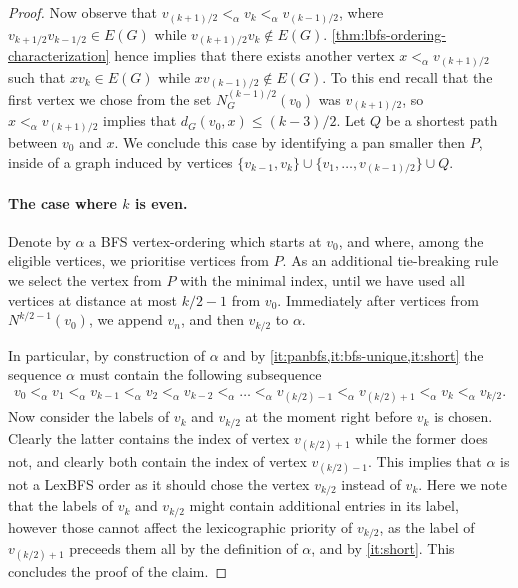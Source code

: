 \documentclass{svproc}
\begin{document}
\begin{proof}
Now observe that $v_{(k+1)/2}<_{\alpha}v_k<_{\alpha}v_{(k-1)/2}$, where
$v_{k+1/2}v_{k-1/2}\in E(G)$ while
$v_{(k+1)/2}v_k\notin E(G)$.  
\cref{thm:lbfs-ordering-characterization} hence implies that there exists another vertex $x<_{\alpha}v_{(k+1)/2}$ such that $xv_k\in E(G)$
while $xv_{(k-1)/2}\notin E(G)$.
To this end recall that the first vertex we chose 
from the set $N_G^{(k-1)/2}(v_0)$ was $v_{(k+1)/2}$, so $x<_{\alpha}v_{(k+1)/2}$ implies that 
$d_G(v_0,x)\le (k-3)/2$. 
Let $Q$ be a shortest path between $v_0$ and $x$.
We conclude this case by identifying a pan smaller then $P$,
inside of a graph induced by vertices $\{v_{k-1}, v_k\}\cup\{v_1,\dots,v_{(k-1)/2}\}\cup Q$.


\paragraph{The case where $k$ is even.}
Denote by $\alpha$ a BFS vertex-ordering which starts at $v_0$, and where,
among the eligible vertices, we prioritise vertices from $P$.
As an additional tie-breaking rule we select the vertex from $P$ with the minimal index,
until we have used all vertices at distance at most $k/2-1$ from $v_0$.
Immediately after vertices from $N^{k/2-1}(v_0)$, we append $v_n$, and then $v_{k/2}$ to $\alpha$. 

In particular, 
by  construction of $\alpha$ and by \cref{it:panbfs,it:bfs-unique,it:short} the sequence $\alpha$ must contain the following subsequence
\begin{align}
    v_0 <_\alpha 
    v_1 <_\alpha 
    v_{k-1} <_\alpha 
    v_2 <_\alpha 
    v_{k-2} <_\alpha 
    \dots <_\alpha 
    v_{(k/2)-1} <_\alpha 
    v_{(k/2)+1} <_\alpha 
    v_k <_\alpha 
    v_{k/2}.
\end{align}
Now consider the labels of $v_k$ and $v_{k/2}$ at the moment right before $v_k$ is chosen. Clearly the latter contains the index of vertex $v_{(k/2)+1}$ while the former does not, and clearly both contain the index of vertex $v_{(k/2)-1}$. 
This implies that $\alpha$ is not a LexBFS order as it should chose the vertex $v_{k/2}$ instead of $v_k$.
Here we note that the labels of $v_k$ and $v_{k/2}$ might contain additional entries in its label, however those cannot affect the lexicographic priority of  $v_{k/2}$, as the label of  $v_{(k/2)+1}$ preceeds them all by the definition of $\alpha$, and by \cref{it:short}.
This concludes the proof of the claim.


\end{proof}
\end{document}
